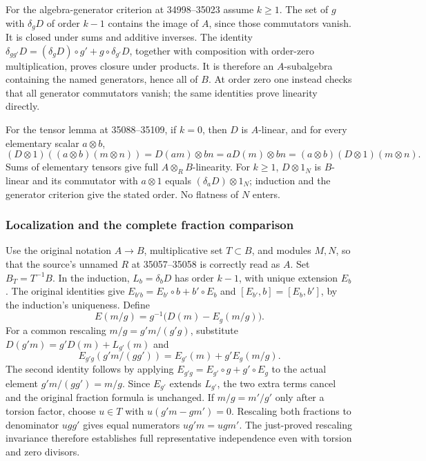 For the algebra-generator criterion at 34998--35023 assume \(k\ge1\). The set of \(g\) with \(\delta_gD\) of order \(k-1\) contains the image of \(A\), since those commutators vanish. It is closed under sums and additive inverses. The identity \(\delta_{gg'}D=(\delta_gD)\circ g'+g\circ\delta_{g'}D\), together with composition with order-zero multiplication, proves closure under products. It is therefore an \(A\)-subalgebra containing the named generators, hence all of \(B\). At order zero one instead checks that all generator commutators vanish; the same identities prove linearity directly.

For the tensor lemma at 35088--35109, if \(k=0\), then \(D\) is \(A\)-linear, and for every elementary scalar \(a\otimes b\), \[
(D\otimes1)((a\otimes b)(m\otimes n))=D(am)\otimes bn
=aD(m)\otimes bn=(a\otimes b)(D\otimes1)(m\otimes n).
\] Sums of elementary tensors give full \(A\otimes_RB\)-linearity. For \(k\ge1\), \(D\otimes1_N\) is \(B\)-linear and its commutator with \(a\otimes1\) equals \((\delta_aD)\otimes1_N\); induction and the generator criterion give the stated order. No flatness of \(N\) enters.

\subsubsection{Localization and the complete fraction comparison}\label{localization-and-the-complete-fraction-comparison}

Use the original notation \(A\to B\), multiplicative set \(T\subset B\), and modules \(M,N\), so that the source's unnamed \(R\) at 35057--35058 is correctly read as \(A\). Set \(B_T=T^{-1}B\). In the induction, \(L_b=\delta_bD\) has order \(k-1\), with unique extension \(E_b\). The original identities give \(E_{b'b}=E_{b'}\circ b+b'\circ E_b\) and \([E_{b'},b]=[E_b,b']\), by the induction's uniqueness. Define \[
E(m/g)=g^{-1}\bigl(D(m)-E_g(m/g)\bigr).
\] For a common rescaling \(m/g=g'm/(g'g)\), substitute \(D(g'm)=g'D(m)+L_{g'}(m)\) and \[
E_{g'g}(g'm/(gg'))=E_{g'}(m)+g'E_g(m/g).
\] The second identity follows by applying \(E_{g'g}=E_{g'}\circ g+g'\circ E_g\) to the actual element \(g'm/(gg')=m/g\). Since \(E_{g'}\) extends \(L_{g'}\), the two extra terms cancel and the original fraction formula is unchanged. If \(m/g=m'/g'\) only after a torsion factor, choose \(u\in T\) with \(u(g'm-gm')=0\). Rescaling both fractions to denominator \(ugg'\) gives equal numerators \(ug'm=ugm'\). The just-proved rescaling invariance therefore establishes full representative independence even with torsion and zero divisors.

